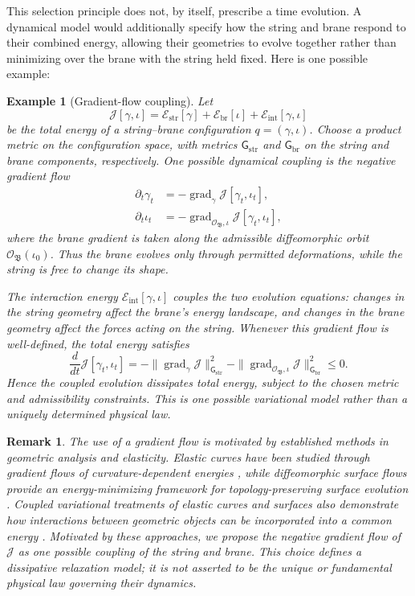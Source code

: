 \documentclass{article}
\newtheorem{rk}{Remark}
\newtheorem{eg}{Example}
\numberwithin{tm}{section}
\numberwithin{dn}{section}
\numberwithin{as}{section}
\numberwithin{rk}{section}
\numberwithin{lem}{section}
\numberwithin{ax}{section}
\numberwithin{pp}{section}
\numberwithin{eg}{section}
\numberwithin{war}{section}
\numberwithin{equation}{section}
\numberwithin{prop}{section}
\numberwithin{nt}{section}
\numberwithin{rc}{section}
\begin{document}
This selection principle does not, by itself, prescribe a time
evolution. A dynamical model would additionally specify how the
string and brane respond to their combined energy, allowing their
geometries to evolve together rather than minimizing over the brane
with the string held fixed. Here is one possible example:
\begin{eg}[Gradient-flow coupling]
	Let
	\[
	\mathcal J[\gamma,\iota]
	=
	\mathcal E_{\mathrm{str}}[\gamma]
	+
	\mathcal E_{\mathrm{br}}[\iota]
	+
	\mathcal E_{\mathrm{int}}[\gamma,\iota]
	\]
	be the total energy of a string--brane configuration
	\(q=(\gamma,\iota)\). Choose a product metric on the configuration
	space, with metrics \(\mathsf G_{\mathrm{str}}\) and
	\(\mathsf G_{\mathrm{br}}\) on the string and brane components,
	respectively. One possible dynamical coupling is the negative
	gradient flow
	\[
	\begin{aligned}
		\partial_t\gamma_t
		&=-\operatorname{grad}_{\gamma}
		\mathcal J[\gamma_t,\iota_t],\\
		\partial_t\iota_t
		&=-\operatorname{grad}_{\mathcal O_{\mathfrak B},\iota}
		\mathcal J[\gamma_t,\iota_t],
	\end{aligned}
	\]
	where the brane gradient is taken along the admissible
	diffeomorphic orbit
	\(\mathcal O_{\mathfrak B}(\iota_0)\). Thus the brane evolves
	only through permitted deformations, while the string is free
	to change its shape.
	
	The interaction energy
	\(\mathcal E_{\mathrm{int}}[\gamma,\iota]\) couples the two
	evolution equations: changes in the string geometry affect the
	brane's energy landscape, and changes in the brane geometry
	affect the forces acting on the string. Whenever this gradient
	flow is well-defined, the total energy satisfies
	\[
	\frac{d}{dt}\mathcal J[\gamma_t,\iota_t]
	=
	-\|\operatorname{grad}_{\gamma}\mathcal J\|_{\mathsf G_{\mathrm{str}}}^{2}
	-\|\operatorname{grad}_{\mathcal O_{\mathfrak B},\iota}\mathcal J\|_{\mathsf G_{\mathrm{br}}}^{2}
	\leq 0.
	\]
	Hence the coupled evolution dissipates total energy, subject
	to the chosen metric and admissibility constraints. This is
	one possible variational model rather than a uniquely determined
	physical law.
\end{eg}

\begin{rk}
	The use of a gradient flow is motivated by established methods
	in geometric analysis and elasticity. Elastic curves have been
	studied through gradient flows of curvature-dependent energies
	\cite{DziukKuwertSchaetzle2002}, while diffeomorphic surface
	flows provide an energy-minimizing framework for topology-preserving
	surface evolution \cite{ZhangEtAl}. Coupled variational treatments
	of elastic curves and surfaces also demonstrate how interactions
	between geometric objects can be incorporated into a common energy
	\cite{Atai}. Motivated by these approaches, we propose the negative
	gradient flow of \(\mathcal J\) as one possible coupling of the
	string and brane. This choice defines a dissipative relaxation
	model; it is not asserted to be the unique or fundamental physical
	law governing their dynamics.
\end{rk}
\end{document}
